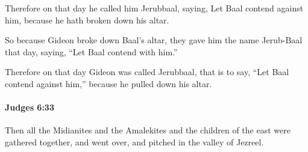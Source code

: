 			\begin{versebox}
					\item[BHS] 
					\item[ASV] Therefore on that day he called him Jerubbaal, saying, Let Baal contend against him, because he hath broken down his altar.
					\item[NIV] So because Gideon broke down Baal’s altar, they gave him the name Jerub-Baal that day, saying, “Let Baal contend with him.”
					\item[NRSV] Therefore on that day Gideon was called Jerubbaal, that is to say, “Let Baal contend against him,” because he pulled down his altar.
			\end{versebox}

		\paragraph{Judges 6:33} %
			\label{JUDGES-6-33}

			Then all the Midianites and the Amalekites and the children of the east were gathered together, and went over, and pitched in the valley of Jezreel.

